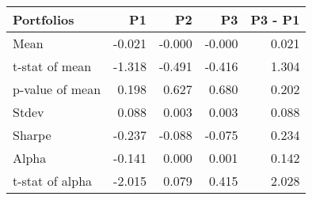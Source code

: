 \begin{tabular}{lrrrr}
\toprule
Portfolios & P1 & P2 & P3 & P3 - P1 \\
\midrule
Mean & -0.021 & -0.000 & -0.000 & 0.021 \\
t-stat of mean & -1.318 & -0.491 & -0.416 & 1.304 \\
p-value of mean & 0.198 & 0.627 & 0.680 & 0.202 \\
Stdev & 0.088 & 0.003 & 0.003 & 0.088 \\
Sharpe & -0.237 & -0.088 & -0.075 & 0.234 \\
Alpha & -0.141 & 0.000 & 0.001 & 0.142 \\
t-stat of alpha & -2.015 & 0.079 & 0.415 & 2.028 \\
\bottomrule
\end{tabular}
